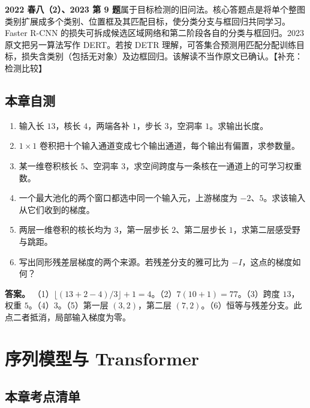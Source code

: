 \documentclass[UTF8,a4paper,zihao=-4,fontset=fandol]{ctexrep}
\begin{document}
\textbf{2022 春八（2）、2023 第 9 题}属于目标检测的旧问法。核心答题点是将单个整图类别扩展成多个类别、位置框及其匹配目标，使分类分支与框回归共同学习。Faster R-CNN 的损失可拆成候选区域网络和第二阶段各自的分类与框回归。2023 原文把另一算法写作 DERT。若按 DETR 理解，可答集合预测用匹配分配训练目标，损失含类别（包括无对象）及边框回归。该解读不当作原文已确认。【补充：检测比较】

\section{本章自测}

\begin{enumerate}
\item 输入长 $13$，核长 $4$，两端各补 $1$，步长 $3$，空洞率 $1$。求输出长度。
\item $1\times1$ 卷积把十个输入通道变成七个输出通道，每个输出有偏置，求参数量。
\item 某一维卷积核长 $5$、空洞率 $3$，求空间跨度与一条核在一通道上的可学习权重数。
\item 一个最大池化的两个窗口都选中同一个输入元，上游梯度为 $-2$、$5$。求该输入从它们收到的梯度。
\item 两层一维卷积的核长均为 $3$，第一层步长 $2$、第二层步长 $1$，求第二层感受野与跳距。
\item 写出同形残差层梯度的两个来源。若残差分支的雅可比为 $-I$，这点的梯度如何？
\end{enumerate}
\textbf{答案。} （1）$\lfloor(13+2-4)/3\rfloor+1=4$。（2）$7(10+1)=77$。（3）跨度 $13$，权重 $5$。（4）$3$。（5）第一层 $(3,2)$，第二层 $(7,2)$。（6）恒等与残差分支。此点二者抵消，局部输入梯度为零。

\chapter{序列模型与 Transformer}

\section{本章考点清单}
\end{document}
